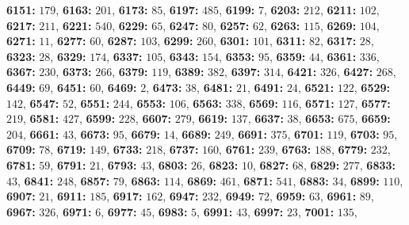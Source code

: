\textsf{\bfseries 6151:} $179$, \textsf{\bfseries 6163:} $201$, \textsf{\bfseries 6173:} $85$, \textsf{\bfseries 6197:} $485$, \textsf{\bfseries 6199:} $7$, \textsf{\bfseries 6203:} $212$, \textsf{\bfseries 6211:} $102$, \textsf{\bfseries 6217:} $211$, \textsf{\bfseries 6221:} $540$, \textsf{\bfseries 6229:} $65$, \textsf{\bfseries 6247:} $80$, \textsf{\bfseries 6257:} $62$, \textsf{\bfseries 6263:} $115$, \textsf{\bfseries 6269:} $104$, \textsf{\bfseries 6271:} $11$, \textsf{\bfseries 6277:} $60$, \textsf{\bfseries 6287:} $103$, \textsf{\bfseries 6299:} $260$, \textsf{\bfseries 6301:} $101$, \textsf{\bfseries 6311:} $82$, \textsf{\bfseries 6317:} $28$, \textsf{\bfseries 6323:} $28$, \textsf{\bfseries 6329:} $174$, \textsf{\bfseries 6337:} $105$, \textsf{\bfseries 6343:} $154$, \textsf{\bfseries 6353:} $95$, \textsf{\bfseries 6359:} $44$, \textsf{\bfseries 6361:} $336$, \textsf{\bfseries 6367:} $230$, \textsf{\bfseries 6373:} $266$, \textsf{\bfseries 6379:} $119$, \textsf{\bfseries 6389:} $382$, \textsf{\bfseries 6397:} $314$, \textsf{\bfseries 6421:} $326$, \textsf{\bfseries 6427:} $268$, \textsf{\bfseries 6449:} $69$, \textsf{\bfseries 6451:} $60$, \textsf{\bfseries 6469:} $2$, \textsf{\bfseries 6473:} $38$, \textsf{\bfseries 6481:} $21$, \textsf{\bfseries 6491:} $24$, \textsf{\bfseries 6521:} $122$, \textsf{\bfseries 6529:} $142$, \textsf{\bfseries 6547:} $52$, \textsf{\bfseries 6551:} $244$, \textsf{\bfseries 6553:} $106$, \textsf{\bfseries 6563:} $338$, \textsf{\bfseries 6569:} $116$, \textsf{\bfseries 6571:} $127$, \textsf{\bfseries 6577:} $219$, \textsf{\bfseries 6581:} $427$, \textsf{\bfseries 6599:} $228$, \textsf{\bfseries 6607:} $279$, \textsf{\bfseries 6619:} $137$, \textsf{\bfseries 6637:} $38$, \textsf{\bfseries 6653:} $675$, \textsf{\bfseries 6659:} $204$, \textsf{\bfseries 6661:} $43$, \textsf{\bfseries 6673:} $95$, \textsf{\bfseries 6679:} $14$, \textsf{\bfseries 6689:} $249$, \textsf{\bfseries 6691:} $375$, \textsf{\bfseries 6701:} $119$, \textsf{\bfseries 6703:} $95$, \textsf{\bfseries 6709:} $78$, \textsf{\bfseries 6719:} $149$, \textsf{\bfseries 6733:} $218$, \textsf{\bfseries 6737:} $160$, \textsf{\bfseries 6761:} $239$, \textsf{\bfseries 6763:} $188$, \textsf{\bfseries 6779:} $232$, \textsf{\bfseries 6781:} $59$, \textsf{\bfseries 6791:} $21$, \textsf{\bfseries 6793:} $43$, \textsf{\bfseries 6803:} $26$, \textsf{\bfseries 6823:} $10$, \textsf{\bfseries 6827:} $68$, \textsf{\bfseries 6829:} $277$, \textsf{\bfseries 6833:} $43$, \textsf{\bfseries 6841:} $248$, \textsf{\bfseries 6857:} $79$, \textsf{\bfseries 6863:} $114$, \textsf{\bfseries 6869:} $461$, \textsf{\bfseries 6871:} $541$, \textsf{\bfseries 6883:} $34$, \textsf{\bfseries 6899:} $110$, \textsf{\bfseries 6907:} $21$, \textsf{\bfseries 6911:} $185$, \textsf{\bfseries 6917:} $162$, \textsf{\bfseries 6947:} $232$, \textsf{\bfseries 6949:} $72$, \textsf{\bfseries 6959:} $63$, \textsf{\bfseries 6961:} $89$, \textsf{\bfseries 6967:} $326$, \textsf{\bfseries 6971:} $6$, \textsf{\bfseries 6977:} $45$, \textsf{\bfseries 6983:} $5$, \textsf{\bfseries 6991:} $43$, \textsf{\bfseries 6997:} $23$, \textsf{\bfseries 7001:} $135$, 
